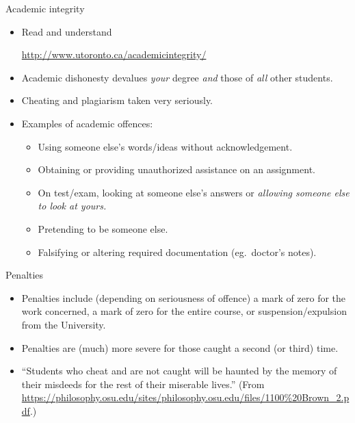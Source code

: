 \documentclass[unknownkeysallowed]{beamer}\usepackage[]{graphicx}\usepackage[]{color}
\begin{document}
\begin{frame}[fragile]{Academic integrity}

  \begin{itemize}
  \item Read and understand

      \url{http://www.utoronto.ca/academicintegrity/}

  \item Academic dishonesty devalues \emph{your} degree \emph{and}
    those of \emph{all} other students.
  \item Cheating and plagiarism taken very seriously.
  \item Examples of academic offences:
    \begin{itemize}
    \item Using someone else's words/ideas without acknowledgement.
    \item Obtaining or providing unauthorized assistance on an assignment.
    \item On test/exam, looking at someone else's answers or
      \emph{allowing someone else to look at yours.}
    \item Pretending to be someone else.
    \item Falsifying or altering required documentation (eg.\ doctor's notes).
    \end{itemize}
  \end{itemize}
  
\end{frame}

\begin{frame}[fragile]{Penalties}
  
  \begin{itemize}
  \item Penalties include (depending on seriousness of offence) a mark
    of zero for 
    the work concerned, a mark of zero for the entire course, or
    suspension/expulsion from the University.
  \item Penalties are (much) more severe for those caught a second (or
    third) time.
  \item ``Students who cheat and are not caught will be haunted by the
    memory of their misdeeds for the rest of their miserable lives.''
    (From
    \url{https://philosophy.osu.edu/sites/philosophy.osu.edu/files/1100%20Brown_2.pdf}.)
  \end{itemize}
  
\end{frame}
\end{document}
